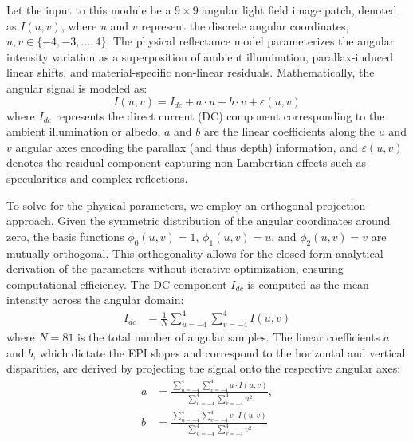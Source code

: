 \documentclass[lettersize,journal]{IEEEtran}
\begin{document}
Let the input to this module be a $9 \times 9$ angular light field image patch, denoted as $I(u,v)$, where $u$ and $v$ represent the discrete angular coordinates, $u, v \in \{-4, -3, \dots, 4\}$. The physical reflectance model parameterizes the angular intensity variation as a superposition of ambient illumination, parallax-induced linear shifts, and material-specific non-linear residuals. Mathematically, the angular signal is modeled as:
\begin{equation}
I(u,v) = I_{dc} + a \cdot u + b \cdot v + \varepsilon(u,v)
\end{equation}
where $I_{dc}$ represents the direct current (DC) component corresponding to the ambient illumination or albedo, $a$ and $b$ are the linear coefficients along the $u$ and $v$ angular axes encoding the parallax (and thus depth) information, and $\varepsilon(u,v)$ denotes the residual component capturing non-Lambertian effects such as specularities and complex reflections.

To solve for the physical parameters, we employ an orthogonal projection approach. Given the symmetric distribution of the angular coordinates around zero, the basis functions $\phi_0(u,v) = 1$, $\phi_1(u,v) = u$, and $\phi_2(u,v) = v$ are mutually orthogonal. This orthogonality allows for the closed-form analytical derivation of the parameters without iterative optimization, ensuring computational efficiency. The DC component $I_{dc}$ is computed as the mean intensity across the angular domain:
\begin{equation}
\begin{aligned}
I_{dc} &= \frac{1}{N} \sum_{u=-4}^{4} \sum_{v=-4}^{4} I(u,v)
\end{aligned}
\end{equation}
where $N = 81$ is the total number of angular samples. The linear coefficients $a$ and $b$, which dictate the EPI slopes and correspond to the horizontal and vertical disparities, are derived by projecting the signal onto the respective angular axes:
\begin{align}
a &= \frac{\sum_{u=-4}^{4} \sum_{v=-4}^{4} u \cdot I(u,v)}{\sum_{u=-4}^{4} \sum_{v=-4}^{4} u^2}, \\
b &= \frac{\sum_{u=-4}^{4} \sum_{v=-4}^{4} v \cdot I(u,v)}{\sum_{u=-4}^{4} \sum_{v=-4}^{4} v^2}
\end{align}
\end{document}
